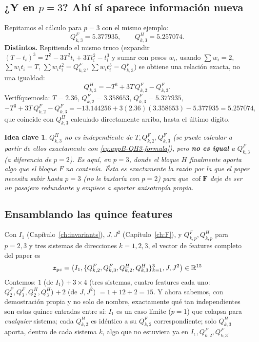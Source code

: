 \documentclass[11pt,a4paper]{article}
\newtheorem{takeaway}{Idea clave}
\newcommand{\Cof}{\operatorname{cof}}
\newcommand{\R}{\mathbb{R}}
\begin{document}
\subsection{¿Y en $p=3$? Ah\'i s\'i aparece informaci\'on nueva}

Repitamos el c\'alculo para $p=3$ con el mismo ejemplo:
\[
 Q_{k,3}^F=5.377935,\qquad Q_{k,3}^H=5.257074.
\]
\textbf{Distintos.} Repitiendo el mismo truco (expandir
$(T-t_i)^3=T^3-3T^2t_i+3Tt_i^2-t_i^3$ y sumar con pesos $w_i$,
usando $\sum w_i=2$, $\sum w_it_i=T$, $\sum w_it_i^2=Q_{k,2}^F$,
$\sum w_it_i^3=Q_{k,3}^F$) se obtiene una relaci\'on exacta, no una
igualdad:
\begin{equation}
 Q_{k,3}^H=-T^3+3T\,Q_{k,2}^F-Q_{k,3}^F.
 \label{eq:appB-QH3-formula}
\end{equation}
Verif\'iquemosla: $T=2.36$, $Q_{k,2}^F=3.358653$, $Q_{k,3}^F=5.377935$,
\[
 -T^3+3T\,Q_{k,2}^F-Q_{k,3}^F
 =-13.144256+3(2.36)(3.358653)-5.377935=5.257074,
\]
que coincide con $Q_{k,3}^H$ calculado directamente arriba, hasta el
\'ultimo d\'igito.

\begin{takeaway}
$Q_{k,3}^H$ no es independiente de $T,Q_{k,2}^F,Q_{k,3}^F$ (se puede
\emph{calcular} a partir de ellos exactamente con
\eqref{eq:appB-QH3-formula}), pero \textbf{no es igual} a
$Q_{k,3}^F$ (a diferencia de $p=2$). Es aqu\'i, en $p=3$, donde el
bloque $H$ finalmente aporta algo que el bloque $F$ no conten\'ia.
\'Esta es exactamente la raz\'on por la que el paper necesita subir
hasta $p=3$ (no le bastar\'ia con $p=2$) para que $\Cof\bm F$ deje de
ser un pasajero redundante y empiece a aportar anisotrop\'ia propia.
\end{takeaway}

\subsection{Ensamblando las quince features}

Con $I_1$ (Cap\'itulo~\ref{ch:invariants}), $J,J^2$
(Cap\'itulo~\ref{ch:F}), y $Q_{k,p}^F,Q_{k,p}^H$ para $p=2,3$ y tres
sistemas de direcciones $k=1,2,3$, el vector de features completo del
paper es
\begin{equation}
 \bm z_{\rm pc}=\big(I_1,\{Q_{k,2}^F,Q_{k,3}^F,Q_{k,2}^H,Q_{k,3}^H\}_{k=1}^3,J,J^2\big)\in\R^{15}
 \label{eq:appB-features}
\end{equation}
Contemos: $1$ (de $I_1$) $+\,3\times4$ (tres sistemas, cuatro
features cada uno: $Q^F_2,Q^F_3,Q^H_2,Q^H_3$) $+\,2$ (de $J,J^2$)
$=1+12+2=15$. Y ahora sabemos, con demostraci\'on propia y no solo de
nombre, exactamente qu\'e tan independientes son estas quince
entradas entre s\'i: $I_1$ es un caso l\'imite ($p=1$) que colapsa
para \emph{cualquier} sistema; cada $Q_{k,2}^H$ es id\'entico a su
$Q_{k,2}^F$ correspondiente; solo $Q_{k,3}^H$ aporta, dentro de cada
sistema $k$, algo que no estuviera ya en $I_1,Q_{k,2}^F,Q_{k,3}^F$.
\end{document}
